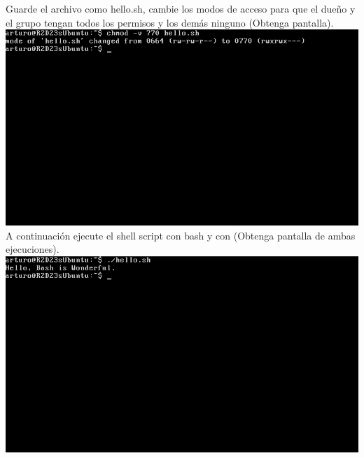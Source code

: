 	Guarde el archivo como hello.sh, cambie los modos de acceso para que el dueño y el grupo tengan todos los permisos y los demás ninguno (Obtenga pantalla). \newline
		\includegraphics[width=\textwidth]{imagenes/chmod.png}
	A continuación ejecute el shell script con bash y con (Obtenga pantalla de ambas ejecuciones). \newline
		\includegraphics[width=\textwidth]{imagenes/exe.png}